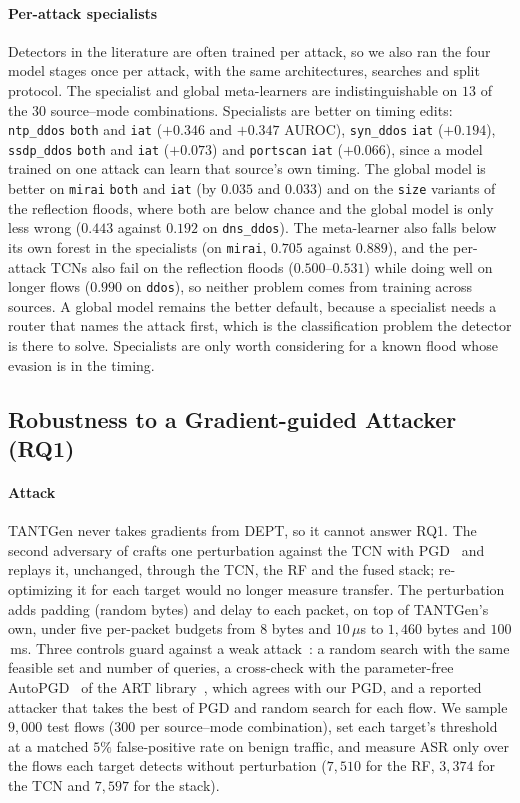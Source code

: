 \documentclass[acmtog,nonacm,pbalance]{acmart}
\newcommand{\src}[1]{\texttt{#1}}
\newcommand{\dmode}[1]{\texttt{#1}}
\begin{document}
\paragraph{Per-attack specialists} Detectors in the literature are often trained
per attack, so we also ran the four model stages once per attack, with the same
architectures, searches and split protocol. The specialist and global
meta-learners are indistinguishable on $13$ of the $30$ source--mode
combinations. Specialists are better on timing edits: \src{ntp\_ddos}
\dmode{both} and \dmode{iat} ($+0.346$ and $+0.347$ AUROC), \src{syn\_ddos}
\dmode{iat} ($+0.194$), \src{ssdp\_ddos} \dmode{both} and \dmode{iat}
($+0.073$) and \src{portscan} \dmode{iat} ($+0.066$), since a model trained on
one attack can learn that source's own timing. The global model is better on
\src{mirai} \dmode{both} and \dmode{iat} (by $0.035$ and $0.033$) and on the
\dmode{size} variants of the reflection floods, where both are below chance and
the global model is only less wrong ($0.443$ against $0.192$ on
\src{dns\_ddos}). The meta-learner also falls below its own forest in the
specialists (on \src{mirai}, $0.705$ against $0.889$), and the per-attack TCNs
also fail on the reflection floods ($0.500$--$0.531$) while doing well on longer
flows ($0.990$ on \src{ddos}), so neither problem comes from training across
sources. A global model remains the better default, because a specialist needs a
router that names the attack first, which is the classification problem the
detector is there to solve. Specialists are only worth considering for a known
flood whose evasion is in the timing.

\subsection{Robustness to a Gradient-guided Attacker (RQ1)}\label{sec:eval-rq1}

\paragraph{Attack} TANTGen never takes gradients from DEPT, so it cannot
answer RQ1. The second adversary of  crafts one perturbation
against the TCN with PGD~\cite{madry2018towards} and replays it, unchanged,
through the TCN, the RF and the fused stack; re-optimizing it for each target
would no longer measure transfer. The perturbation adds padding (random bytes)
and delay to each packet, on top of TANTGen's own, under five per-packet budgets
from $8$ bytes and $10\,\mu$s to $1{,}460$ bytes and $100$\,ms. Three controls
guard against a weak attack~\cite{carlini2019evaluating,tramer2020adaptive}: a
random search with the same feasible set and number of queries, a cross-check
with the parameter-free AutoPGD~\cite{croce2020reliable} of the ART
library~\cite{nicolae2018adversarial}, which agrees with our PGD, and a reported
attacker that takes the best of PGD and random search for each flow. We sample
$9{,}000$ test flows ($300$ per source--mode combination), set each target's
threshold at a matched $5\%$ false-positive rate on benign traffic, and measure
ASR only over the flows each target detects without perturbation ($7{,}510$ for
the RF, $3{,}374$ for the TCN and $7{,}597$ for the stack).
\end{document}
